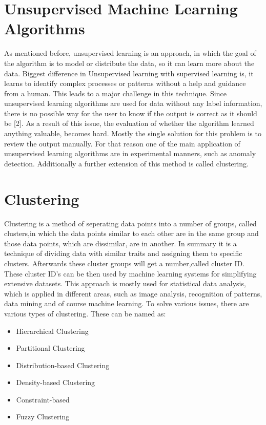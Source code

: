\documentclass[conference]{IEEEtran}
\begin{document}
\section{Unsupervised Machine Learning Algorithms}

As mentioned before, unsupervised learning is an approach, in which the goal of the algorithm is to model or distribute the data, so it can learn more about the data. Biggest difference in Unsupervised learning with supervised learning is, it learns to identify complex processes or patterns without a help and guidance from a human. This leads to a major challenge in this technique. Since unsupervised learning algorithms are used for data without any label information, there is no possible way for the user to know if the output is correct as it should be [2]. As a result of this issue, the evaluation of whether the algorithm learned anything valuable, becomes hard. Mostly the single solution for this problem is to review the output manually. For that reason one of the main application of unsupervised learning algorithms are in experimental manners, such as anomaly detection. Additionally a further extension of this method is called clustering.

\section{Clustering}
Clustering is a method of seperating data points into a number of groups, called clusters,in which the data points similar to each other are in the same group and those data points, which are dissimilar, are in another. In summary it is a technique of dividing data with similar traits and assigning them to specific clusters. Afterwards these cluster groups will get a number,called cluster ID. These cluster ID's can be then used by machine learning systems for simplifying extensive datasets. This approach is mostly used for statistical data analysis, which is applied in different areas, such as image analysis, recognition of patterns, data mining and of course machine learning. To solve various issues, there are various types of clustering. These can be named as: \\

\begin{itemize}
\item Hierarchical Clustering
\item Partitional Clustering
\item Distribution-based Clustering
\item Density-based Clustering 
\item Constraint-based
\item Fuzzy Clustering
\end{itemize}
\end{document}
